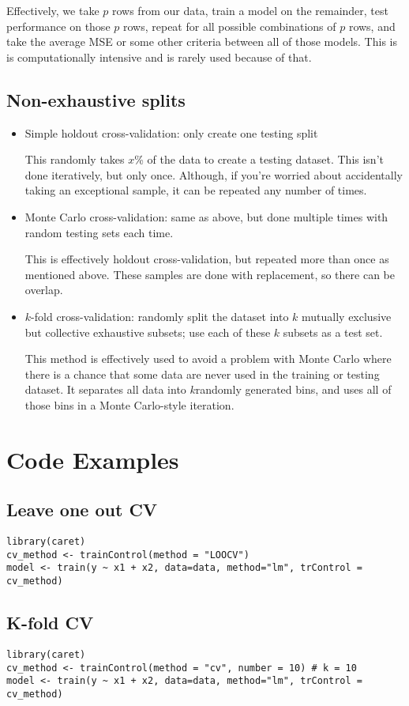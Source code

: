 \documentclass[titlepage, 12pt, leqno]{article}
\begin{document}
Effectively, we take $p$ rows from our data, train a model on the remainder,
test performance on those $p$ rows, repeat for all possible combinations of $p$
rows, and take the average MSE or some other criteria between all of those models.
This is is computationally intensive and is rarely used because of that.

\subsection{Non-exhaustive splits}
\begin{itemize}
    \item Simple holdout cross-validation: only create one testing split
        
        This randomly takes $x$\% of the data to create a testing dataset. This
        isn't done iteratively, but only once. Although, if you're worried about
        accidentally taking an exceptional sample, it can be repeated any number
        of times.

    \item Monte Carlo cross-validation: same as above, but done multiple times
        with random testing sets each time.
        
        This is effectively holdout cross-validation, but repeated more than once
        as mentioned above. These samples are done with replacement, so there can
        be overlap.

    \item $k$-fold cross-validation: randomly split the dataset into $k$ mutually
        exclusive but collective exhaustive subsets; use each of these $k$ subsets
        as a test set.
        
        This method is effectively used to avoid a problem with Monte Carlo where
        there is a chance that some data are never used in the training or testing
        dataset. It separates all data into $k $randomly generated bins, and uses
        all of those bins in a Monte Carlo-style iteration.
\end{itemize}

\pagebreak
\section{Code Examples}
\subsection{Leave one out CV}
\begin{verbatim}
library(caret)
cv_method <- trainControl(method = "LOOCV")
model <- train(y ~ x1 + x2, data=data, method="lm", trControl = cv_method)
\end{verbatim}

\subsection{K-fold CV}
\begin{verbatim}
library(caret)
cv_method <- trainControl(method = "cv", number = 10) # k = 10
model <- train(y ~ x1 + x2, data=data, method="lm", trControl = cv_method)
\end{verbatim}
\end{document}
